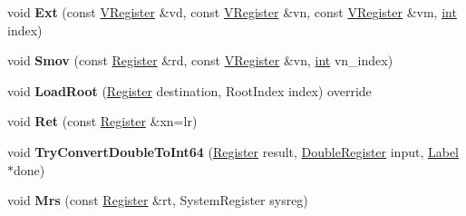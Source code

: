 \begin{DoxyCompactItemize}
\mbox{\label{classv8_1_1internal_1_1TurboAssembler_a7d0f0bbf34bd2e402e8afc8150e9e070}} 
void {\bfseries Ext} (const \mbox{\hyperlink{classv8_1_1internal_1_1VRegister}{V\+Register}} \&vd, const \mbox{\hyperlink{classv8_1_1internal_1_1VRegister}{V\+Register}} \&vn, const \mbox{\hyperlink{classv8_1_1internal_1_1VRegister}{V\+Register}} \&vm, \mbox{\hyperlink{classint}{int}} index)
\item 
\mbox{\label{classv8_1_1internal_1_1TurboAssembler_ae63747480c40bdf1f65420ea4e6a97a2}} 
void {\bfseries Smov} (const \mbox{\hyperlink{classv8_1_1internal_1_1Register}{Register}} \&rd, const \mbox{\hyperlink{classv8_1_1internal_1_1VRegister}{V\+Register}} \&vn, \mbox{\hyperlink{classint}{int}} vn\+\_\+index)
\item 
\mbox{\label{classv8_1_1internal_1_1TurboAssembler_a931af7443ae4f741ae52403554cca319}} 
void {\bfseries Load\+Root} (\mbox{\hyperlink{classv8_1_1internal_1_1Register}{Register}} destination, Root\+Index index) override
\item 
\mbox{\label{classv8_1_1internal_1_1TurboAssembler_ac687ea8909feca2383e7720fe7b2231a}} 
void {\bfseries Ret} (const \mbox{\hyperlink{classv8_1_1internal_1_1Register}{Register}} \&xn=lr)
\item 
\mbox{\label{classv8_1_1internal_1_1TurboAssembler_af58a05c8fdf20a58ecb116b7d3b7dca9}} 
void {\bfseries Try\+Convert\+Double\+To\+Int64} (\mbox{\hyperlink{classv8_1_1internal_1_1Register}{Register}} result, \mbox{\hyperlink{classv8_1_1internal_1_1DoubleRegister}{Double\+Register}} input, \mbox{\hyperlink{classv8_1_1internal_1_1Label}{Label}} $\ast$done)
\item 
\mbox{\label{classv8_1_1internal_1_1TurboAssembler_a64abb00855f5abdc5b6cf3851b1f46f1}} 
void {\bfseries Mrs} (const \mbox{\hyperlink{classv8_1_1internal_1_1Register}{Register}} \&rt, System\+Register sysreg)
\item 
\mbox{\label{classv8_1_1internal_1_1TurboAssembler_aebd70343720df393021ce72e183385b3}} 

\end{DoxyCompactItemize}
